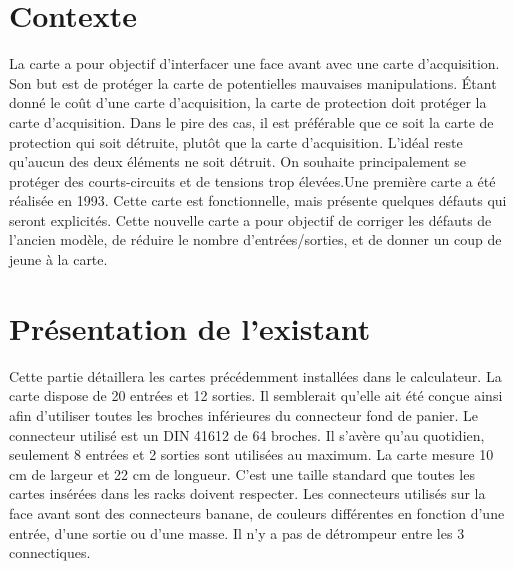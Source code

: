 \documentclass{report}
\begin{document}


\tableofcontents
\thispagestyle{empty}
\entete
\newpage
\thispagestyle{empty}
\listoffigures
\entete
\listoftables
\entete



\chapter{Contexte}
\thispagestyle{empty}
La carte a pour objectif d'interfacer une face avant avec une carte d'acquisition. Son but est de protéger la carte de potentielles mauvaises manipulations. Étant donné le coût d'une carte d'acquisition, la carte de protection doit protéger la carte d'acquisition. Dans le pire des cas, il est préférable que ce soit la carte de protection qui soit détruite, plutôt que la carte d'acquisition. L'idéal reste qu'aucun des deux éléments ne soit détruit. On souhaite principalement se protéger des courts-circuits et de tensions trop élevées.Une première carte a été réalisée en 1993. Cette carte est fonctionnelle, mais présente quelques défauts qui seront explicités. Cette nouvelle carte a pour objectif de corriger les défauts de l'ancien modèle, de réduire le nombre d'entrées/sorties, et de donner un coup de jeune à la carte.


\chapter{Présentation de l'existant}
\thispagestyle{empty}
Cette partie détaillera les cartes précédemment installées dans le calculateur. La carte dispose de 20 entrées et 12 sorties. Il semblerait qu'elle ait été conçue ainsi afin d'utiliser toutes les broches inférieures du connecteur fond de panier. Le connecteur utilisé est un DIN 41612 de 64 broches. Il s'avère qu'au quotidien, seulement 8 entrées et 2 sorties sont utilisées au maximum. La carte mesure 10 cm de largeur et 22 cm de longueur. C'est une taille standard que toutes les cartes insérées dans les racks doivent respecter. Les connecteurs utilisés sur la face avant sont des connecteurs banane, de couleurs différentes en fonction d'une entrée, d'une sortie ou d'une masse. Il n'y a pas de détrompeur entre les 3 connectiques.
\end{document}
